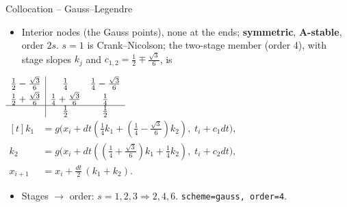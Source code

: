 \documentclass[11pt,aspectratio=169]{beamer}
\begin{document}
\begin{frame}{Collocation -- Gauss--Legendre}

\begin{itemize}
\item Interior nodes (the Gauss points), none at the ends; \textbf{symmetric},
  \textbf{A-stable}, order $2s$. $s{=}1$ is Crank--Nicolson; the two-stage
  member (order 4), with stage slopes $k_j$ and $c_{1,2}=\tfrac12\mp\tfrac{\sqrt3}{6}$, is
\end{itemize}

\begin{center}
\small
$\begin{array}{c|cc}
  \tfrac12-\tfrac{\sqrt3}{6} & \tfrac14 & \tfrac14-\tfrac{\sqrt3}{6}\\[2pt]
  \tfrac12+\tfrac{\sqrt3}{6} & \tfrac14+\tfrac{\sqrt3}{6} & \tfrac14\\ \hline
  & \tfrac12 & \tfrac12
\end{array}$
\quad
$\begin{aligned}[t]
k_1 &= g\bigl(x_i + dt(\tfrac14 k_1 + (\tfrac14{-}\tfrac{\sqrt3}{6})k_2),\; t_i{+}c_1 dt\bigr),\\
k_2 &= g\bigl(x_i + dt((\tfrac14{+}\tfrac{\sqrt3}{6})k_1 + \tfrac14 k_2),\; t_i{+}c_2 dt\bigr),\\
x_{i+1} &= x_i + \tfrac{dt}{2}\,(k_1 + k_2).
\end{aligned}$
\end{center}

\begin{itemize}
\item Stages $\to$ order: $s=1,2,3 \Rightarrow 2,4,6$. \quad
  \texttt{scheme=gauss, order=4}.
\end{itemize}

\end{frame}
\end{document}
